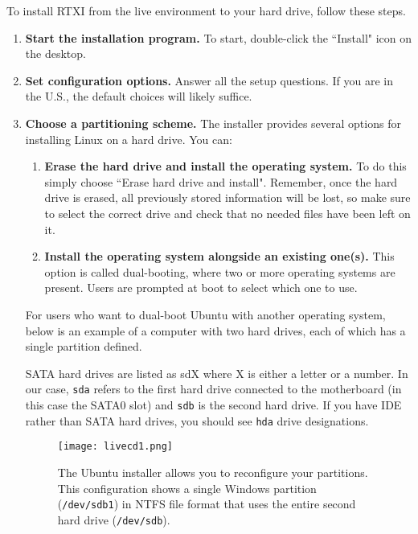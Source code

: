 To install RTXI from the live environment to your hard drive, follow these steps. 

\begin{enumerate}
\item \textbf{Start the installation program.} To start, double-click the ``Install" icon on the desktop.

\item \textbf{Set configuration options.} Answer all the setup questions. If you are in the U.S., the default choices will likely suffice. 

\item \textbf{Choose a partitioning scheme.} The installer provides several options for installing Linux on a hard drive. You can:
	\begin{enumerate}
	\item \textbf{Erase the hard drive and install the operating system.} To do this simply choose ``Erase hard drive and install". Remember, once the hard drive is erased, all previously stored information will be lost, so make sure to select the correct drive and check that no needed files have been left on it. 
	\item \textbf{Install the operating system alongside an existing one(s).} This option is called dual-booting, where two or more operating systems are present. Users are prompted at boot to select which one to use. 
	\end{enumerate}

For users who want to dual-boot Ubuntu with another operating system, below is an example of a computer with two hard drives, each of which has a single partition defined. 

SATA hard drives are listed as sdX where X is either a letter or a number. In our case, \texttt{sda} refers to the first hard drive connected to the motherboard (in this case the SATA0 slot) and \texttt{sdb} is the second hard drive. If you have IDE rather than SATA hard drives, you should see \texttt{hda} drive designations. 

\begin{figure}[h]
\begin{center}
\texttt{[image: livecd1.png]} 
\caption[Ubuntu Installation: Preparing your partitions]{The Ubuntu installer allows you to reconfigure your partitions. This configuration shows a single Windows partition (\texttt{/dev/sdb1}) in NTFS file format that uses the entire second hard drive (\texttt{/dev/sdb}).} 
\end{center}
\end{figure}


\end{enumerate}
